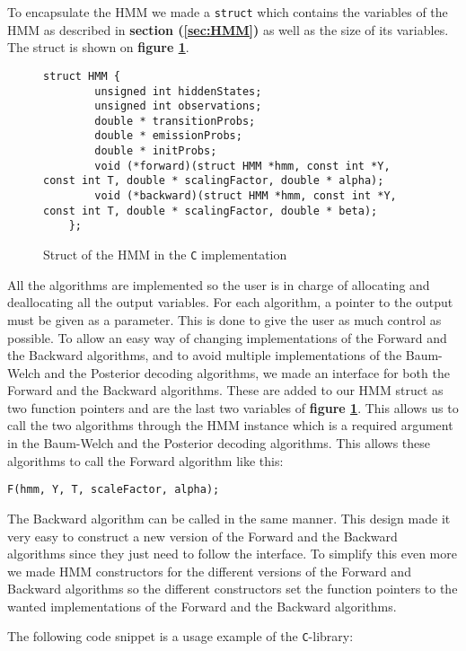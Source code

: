 To encapsulate the HMM we made a \texttt{struct} which contains the variables of the HMM as described in \textbf{section (\ref{sec:HMM})} as well as the size of its variables. The struct is shown on \textbf{figure \ref{fig:hmmstruct}}.
\begin{figure}[H]
    \centering
    \begin{lstlisting}[style=CStyle]
    struct HMM {
        unsigned int hiddenStates;
        unsigned int observations;
        double * transitionProbs;
        double * emissionProbs;
        double * initProbs;
        void (*forward)(struct HMM *hmm, const int *Y, const int T, double * scalingFactor, double * alpha);
        void (*backward)(struct HMM *hmm, const int *Y, const int T, double * scalingFactor, double * beta);
    };\end{lstlisting}
    \caption{Struct of the HMM in the \texttt{C} implementation}
    \label{fig:hmmstruct}
\end{figure}
All the algorithms are implemented so the user is in charge of allocating and deallocating all the output variables. For each algorithm, a pointer to the output must be given as a parameter. This is done to give the user as much control as possible.
To allow an easy way of changing implementations of the Forward and the Backward algorithms, and to avoid multiple implementations of the Baum-Welch and the Posterior decoding algorithms, we made an interface for both the Forward and the Backward algorithms. These are added to our HMM struct as two function pointers and are the last two variables of \textbf{figure \ref{fig:hmmstruct}}. This allows us to call the two algorithms through the HMM instance which is a required argument in the Baum-Welch and the Posterior decoding algorithms. This allows these algorithms to call the Forward algorithm like this:
\begin{lstlisting}[style=CStyle]
F(hmm, Y, T, scaleFactor, alpha);\end{lstlisting}

The Backward algorithm can be called in the same manner. 
This design made it very easy to construct a new version of the Forward and the Backward algorithms since they just need to follow the interface. To simplify this even more we made HMM constructors for the different versions of the Forward and Backward algorithms so the different constructors set the function pointers to the wanted implementations of the Forward and the Backward algorithms.

The following code snippet is a usage example of the \texttt{C}-library:


